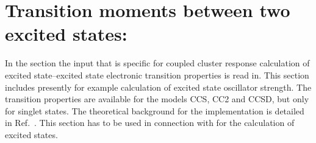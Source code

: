 
\section{Transition moments between two excited states: }
\label{sec:ccqr2r}

In the  section the input that is
specific for coupled cluster response calculation of excited state--excited state
electronic transition properties is read in.
This section includes presently for example calculation of excited state
oscillator strength.
The transition properties are available for the models CCS, CC2 and CCSD,
but only for singlet states.
The theoretical background for the implementation is detailed in Ref.\ \cite{Christiansen:CCLR,Christiansen:QEL}.
This section has to be used in connection with  for the 
calculation of excited states.

\begin{center}
\end{center}

